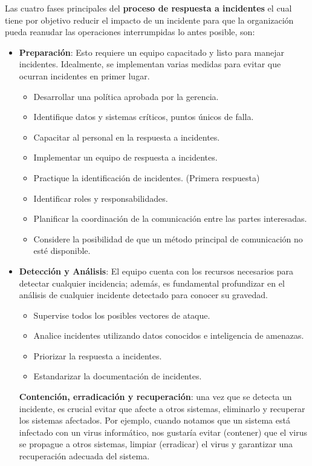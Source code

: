 Las cuatro fases principales del \textbf{proceso de respuesta a incidentes} el cual tiene por objetivo reducir el impacto de un incidente para que la organización pueda reanudar las operaciones interrumpidas lo antes posible, son:
\begin{itemize}
    \item \textbf{Preparación}: Esto requiere un equipo capacitado y listo para manejar incidentes. Idealmente, se implementan varias medidas para evitar que ocurran incidentes en primer lugar.
    \begin{itemize}
        \item Desarrollar una política aprobada por la gerencia.
        \item Identifique datos y sistemas críticos, puntos únicos de falla.
        \item Capacitar al personal en la respuesta a incidentes.
        \item Implementar un equipo de respuesta a incidentes. 
        \item Practique la identificación de incidentes. (Primera respuesta)
        \item Identificar roles y responsabilidades.
        \item Planificar la coordinación de la comunicación entre las partes interesadas.
        \item Considere la posibilidad de que un método principal de comunicación no esté disponible.
    \end{itemize}
\item \textbf{Detección y Análisis}: El equipo cuenta con los recursos necesarios para detectar cualquier incidencia; además, es fundamental profundizar en el análisis de cualquier incidente detectado para conocer su gravedad.
    \begin{itemize}
        \item Supervise todos los posibles vectores de ataque.
        \item Analice incidentes utilizando datos conocidos e inteligencia de amenazas.
        \item Priorizar la respuesta a incidentes.
        \item Estandarizar la documentación de incidentes.
    \end{itemize}
\textbf{Contención, erradicación y recuperación}: una vez que se detecta un incidente, es crucial evitar que afecte a otros sistemas, eliminarlo y recuperar los sistemas afectados. Por ejemplo, cuando notamos que un sistema está infectado con un virus informático, nos gustaría evitar (contener) que el virus se propague a otros sistemas, limpiar (erradicar) el virus y garantizar una recuperación adecuada del sistema.

\end{itemize}
